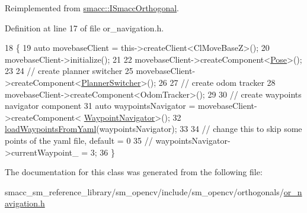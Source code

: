 Reimplemented from \hyperlink{classsmacc_1_1ISmaccOrthogonal_a6bb31c620cb64dd7b8417f8705c79c7a}{smacc\+::\+I\+Smacc\+Orthogonal}.



Definition at line 17 of file or\+\_\+navigation.\+h.


\begin{DoxyCode}
18         \{
19             \textcolor{keyword}{auto} movebaseClient = this->createClient<ClMoveBaseZ>();
20             movebaseClient->initialize();
21 
22             movebaseClient->createComponent<\hyperlink{classcl__move__base__z_1_1Pose}{Pose}>();
23 
24             \textcolor{comment}{// create planner switcher}
25             movebaseClient->createComponent<\hyperlink{classcl__move__base__z_1_1PlannerSwitcher}{PlannerSwitcher}>();
26 
27             \textcolor{comment}{// create odom tracker}
28             movebaseClient->createComponent<OdomTracker>();
29 
30             \textcolor{comment}{// create waypoints navigator component}
31             \textcolor{keyword}{auto} waypointsNavigator = movebaseClient->createComponent<
      \hyperlink{classcl__move__base__z_1_1WaypointNavigator}{WaypointNavigator}>();
32             \hyperlink{classsm__opencv_1_1OrNavigation_aa99364dd28b18be701d85187f9896999}{loadWaypointsFromYaml}(waypointsNavigator);
33 
34             \textcolor{comment}{// change this to skip some points of the yaml file, default = 0}
35             \textcolor{comment}{// waypointsNavigator->currentWaypoint\_ = 3;}
36         \}
\end{DoxyCode}


The documentation for this class was generated from the following file\+:\begin{DoxyCompactItemize}
\item 
smacc\+\_\+sm\+\_\+reference\+\_\+library/sm\+\_\+opencv/include/sm\+\_\+opencv/orthogonals/\hyperlink{sm__opencv_2include_2sm__opencv_2orthogonals_2or__navigation_8h}{or\+\_\+navigation.\+h}\end{DoxyCompactItemize}
